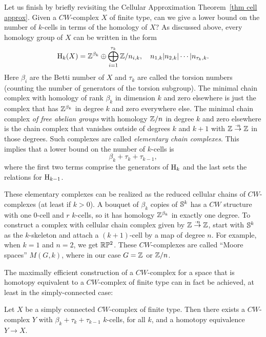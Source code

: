 Let us finish by briefly revisiting the Cellular Approximation Theorem~\ref{thm cell approx}. Given a $CW$-complex $X$ of finite type, can we give a lower bound on the number of $k$-cells in terms of the homology of $X$? As discussed above, every homology group of $X$ can be written in the form
\[\mathrm{H}_k(X)=\mathbb{Z}^{\beta_k}\oplus \bigoplus_{i=1}^{\tau_k}\mathbb{Z}\slash n_{i,k},\quad n_{1,k}|n_{2,k}|\cdots |n_{\tau_k,k}.\]
Here $\beta_i$ are the Betti number of $X$ and $\tau_k$ are called the torsion numbers (counting the number of generators of the torsion subgroup). The minimal chain complex with homology of rank $\beta_k$ in dimension $k$ and zero elsewhere is just the complex that has $\mathbb{Z}^{\beta_k}$ in degree $k$ and zero everywhere else. The minimal chain complex \emph{of free abelian groups} with homology $\mathbb{Z}\slash n$ in degree $k$ and zero elsewhere is the chain complex that vanishes outside of degrees $k$ and $k+1$ with $\mathbb{Z}\overset{\cdot n}{\to}\mathbb{Z}$ in those degrees. Such complexes are called \emph{elementary chain complexes}. This implies that a lower bound on the number of $k$-cells is
\[\beta_k+\tau_k+\tau_{k-1},\]
where the first two terms comprise the generators of $\mathrm{H}_k$ and the last sets the relations for $\mathrm{H}_{k-1}$.

These elementary complexes can be realized as the reduced cellular chains of $CW$-complexes (at least if $k>0$). A bouquet of $\beta_k$ copies of $\mathbb{S}^k$ has a $CW$ structure with one $0$-cell and $r$ $k$-cells, so it has homology $\mathbb{Z}^{\beta_k}$ in exactly one degree. To construct a complex with cellular chain complex given by $\mathbb{Z}\overset{\cdot n}{\to}\mathbb{Z}$, start with $\mathbb{S}^k$ as the $k$-skeleton and attach a $(k+1)$-cell by a map of degree $n$. For example, when $k=1$ and $n=2$, we get $\mathbb{R}\mathbb{P}^2$. These $CW$-complexes are called ``Moore spaces'' $M(G,k)$, where in our case $G=\mathbb{Z}$ or $\mathbb{Z}\slash n$.

The maximally efficient construction of a $CW$-complex for a space that is homotopy equivalent to a $CW$-complex of finite type can in fact be achieved, at least in the simply-connected case:

\begin{thm}[C.T.C.~Wall]
    Let $X$ be a simply connected $CW$-complex of finite type. Then there exists a $CW$-complex $Y$ with $\beta_k+\tau_k+\tau_{k-1}$ $k$-cells, for all $k$, and a homotopy equivalence $Y\to X$.
\end{thm}


